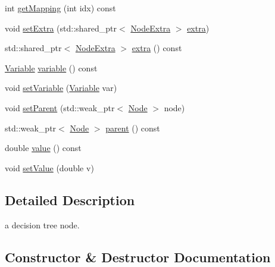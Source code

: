 \begin{DoxyCompactItemize}
\item 
int \mbox{\hyperlink{classdtree_1_1_node_a82bbf8a30241f7e3b61c4bd7774463a6}{get\+Mapping}} (int idx) const
\item 
void \mbox{\hyperlink{classdtree_1_1_node_a0c3f57b73bd7252f8723b4dc31185da2}{set\+Extra}} (std\+::shared\+\_\+ptr$<$ \mbox{\hyperlink{classdtree_1_1_node_extra}{Node\+Extra}} $>$ \mbox{\hyperlink{classdtree_1_1_node_a73de9259c0366a4d323c2b601ac97a36}{extra}})
\item 
std\+::shared\+\_\+ptr$<$ \mbox{\hyperlink{classdtree_1_1_node_extra}{Node\+Extra}} $>$ \mbox{\hyperlink{classdtree_1_1_node_a73de9259c0366a4d323c2b601ac97a36}{extra}} () const
\item 
\mbox{\hyperlink{namespacedtree_a79fe30831a14df904319f9e783b3189b}{Variable}} \mbox{\hyperlink{classdtree_1_1_node_aa678f4328a21536554ab26e47785ca2c}{variable}} () const
\item 
void \mbox{\hyperlink{classdtree_1_1_node_ab21d7f4bf5198156bb2cb01fa449ce57}{set\+Variable}} (\mbox{\hyperlink{namespacedtree_a79fe30831a14df904319f9e783b3189b}{Variable}} var)
\item 
void \mbox{\hyperlink{classdtree_1_1_node_a37e830162fb4a08a668f843ca039f91d}{set\+Parent}} (std\+::weak\+\_\+ptr$<$ \mbox{\hyperlink{classdtree_1_1_node}{Node}} $>$ node)
\item 
std\+::weak\+\_\+ptr$<$ \mbox{\hyperlink{classdtree_1_1_node}{Node}} $>$ \mbox{\hyperlink{classdtree_1_1_node_a7c96641b47e6b2124c80c346849f182b}{parent}} () const
\item 
double \mbox{\hyperlink{classdtree_1_1_node_a3f065f365c3a7ec0a2371070df16a680}{value}} () const
\item 
void \mbox{\hyperlink{classdtree_1_1_node_aab0b6d3b5a771bb07df2c74a7a984eb1}{set\+Value}} (double v)
\end{DoxyCompactItemize}


\subsection{Detailed Description}
a decision tree node. 



\subsection{Constructor \& Destructor Documentation}
\mbox{\label{classdtree_1_1_node_ad74d818e410568df7e3f0c6574f11b07}} 
